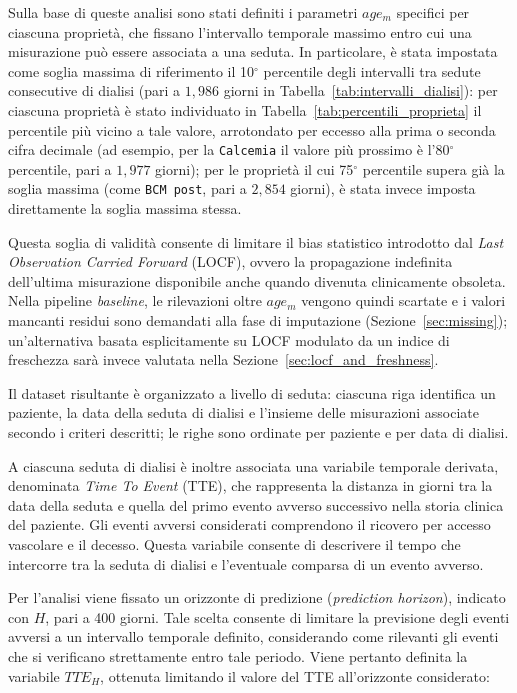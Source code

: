 \documentclass[a4paper,12pt]{report}
\begin{document}
Sulla base di queste analisi sono stati definiti i parametri \(age_m\) specifici per ciascuna proprietà, che fissano l'intervallo temporale massimo entro cui una misurazione può essere associata a una seduta. In particolare, è stata impostata come soglia massima di riferimento il 10$^{\circ}$ percentile degli intervalli tra sedute consecutive di dialisi (pari a \(1{,}986\) giorni in Tabella~\ref{tab:intervalli_dialisi}): per ciascuna proprietà è stato individuato in Tabella~\ref{tab:percentili_proprieta} il percentile più vicino a tale valore, arrotondato per eccesso alla prima o seconda cifra decimale (ad esempio, per la \texttt{Calcemia} il valore più prossimo è l'80$^{\circ}$ percentile, pari a \(1{,}977\) giorni); per le proprietà il cui 75$^{\circ}$ percentile supera già la soglia massima (come \texttt{BCM post}, pari a \(2{,}854\) giorni), è stata invece imposta direttamente la soglia massima stessa.

Questa soglia di validità consente di limitare il bias statistico introdotto dal \textit{Last Observation Carried Forward} (LOCF), ovvero la propagazione indefinita dell'ultima misurazione disponibile anche quando divenuta clinicamente obsoleta. Nella pipeline \textit{baseline}, le rilevazioni oltre \(age_m\) vengono quindi scartate e i valori mancanti residui sono demandati alla fase di imputazione (Sezione~\ref{sec:missing}); un'alternativa basata esplicitamente su LOCF modulato da un indice di freschezza sarà invece valutata nella Sezione~\ref{sec:locf_and_freshness}.

Il dataset risultante è organizzato a livello di seduta: ciascuna riga identifica un paziente, la data della seduta di dialisi e l'insieme delle misurazioni associate secondo i criteri descritti; le righe sono ordinate per paziente e per data di dialisi.

A ciascuna seduta di dialisi è inoltre associata una variabile temporale derivata, denominata \textit{Time To Event} (TTE), che rappresenta la distanza in giorni tra la data della seduta e quella del primo evento avverso successivo nella storia clinica del paziente. Gli eventi avversi considerati comprendono il ricovero per accesso vascolare e il decesso. Questa variabile consente di descrivere il tempo che intercorre tra la seduta di dialisi e l'eventuale comparsa di un evento avverso.

Per l'analisi viene fissato un orizzonte di predizione (\textit{prediction horizon}), indicato con \(H\), pari a 400 giorni. Tale scelta consente di limitare la previsione degli eventi avversi a un intervallo temporale definito, considerando come rilevanti gli eventi che si verificano strettamente entro tale periodo. Viene pertanto definita la variabile \(TTE_H\), ottenuta limitando il valore del TTE all'orizzonte considerato:
\end{document}
